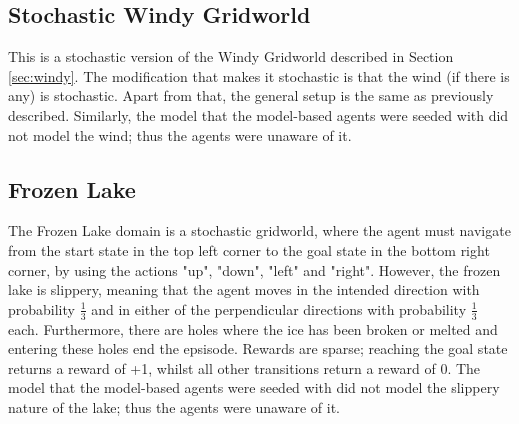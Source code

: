 \subsection{Stochastic Windy Gridworld}
This is a stochastic version of the Windy Gridworld described in Section \ref{sec:windy}. The modification that makes it stochastic is that the wind (if there is any) is stochastic. Apart from that, the general setup is the same as previously described. Similarly, the model that the model-based agents were seeded with did not model the wind; thus the agents were unaware of it.


\subsection{Frozen Lake}
The Frozen Lake domain \cite{1606.01540} is a stochastic gridworld, where the agent must navigate from the start state in the top left corner to the goal state in the bottom right corner, by using the actions "up", "down", "left" and "right". However, the frozen lake is slippery, meaning that the agent moves in the intended direction with probability $\frac{1}{3}$ and in either of the perpendicular directions with probability $\frac{1}{3}$ each. Furthermore, there are holes where the ice has been broken or melted and entering these holes end the epsisode. Rewards are sparse; reaching the goal state returns a reward of +1, whilst all other transitions return a reward of 0. The model that the model-based agents were seeded with did not model the slippery nature of the lake; thus the agents were unaware of it.


